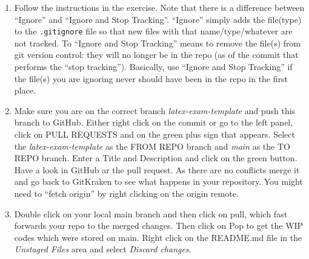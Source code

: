 \begin{enumerate}
\item
Follow the instructions in the exercise.
Note that there is a difference between \enquote{Ignore} and \enquote{Ignore and Stop Tracking}.
\enquote{Ignore} simply adds the file{(type)} to the \texttt{.gitignore} file so that new files with that name/type/whatever are not tracked.
To \enquote{Ignore and Stop Tracking} means to remove the file{(s)} from git version control:
  they will no longer be in the repo (as of the commit that performs the \enquote{stop tracking}).
Basically, use \enquote{Ignore and Stop Tracking} if the file{(s)} you are ignoring never should have been in the repo in the first place.

\item
Make sure you are on the correct branch \emph{latex-exam-template} and push this branch to GitHub.
Either right click on the commit or go to the left panel, click on PULL REQUESTS and on the green plus sign that appears.
Select the \emph{latex-exam-template} as the FROM REPO branch and \emph{main} as the TO REPO branch.
Enter a Title and Description and click on the green button.
Have a look in GitHub ar the pull request.
As there are no conflicts merge it and go back to GitKraken to see what happens in your repository.
You might need to \enquote{fetch origin} by right clicking on the origin remote.

\item
Double click on your local main branch and then click on pull,
  which fast forwards your repo to the merged changes.
Then click on Pop to get the WIP codes which were stored on main.
Right click on the README.md file in the \emph{Unstaged Files} area and select \emph{Discard changes}.

\end{enumerate}
